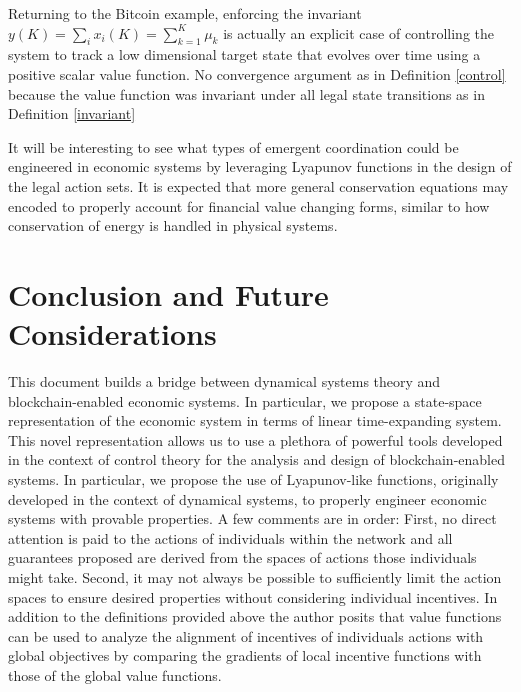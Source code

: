 \documentclass[letterpaper, 10 pt, conference]{ieeeconf}  %
\begin{document}
Returning to the Bitcoin example, enforcing the invariant $y(K) = \sum_i x_i(K) = \sum_{k=1}^K \mu_k$ is actually an explicit case of controlling the system to track a low dimensional target state that evolves over time using a positive scalar value function. No convergence argument as in Definition \ref{control} because the value function was invariant under all legal state transitions as in Definition \ref{invariant}

It will be interesting to see what types of emergent coordination could be engineered in economic systems by leveraging Lyapunov functions in the design of the legal action sets. It is expected that more general conservation equations may encoded to properly account for financial value changing forms, similar to how conservation of energy is handled in physical systems.

\section{Conclusion and Future Considerations} \label{sec:Conclusions}

This document builds a bridge between dynamical systems theory and blockchain-enabled economic systems. In particular, we propose a state-space representation of the economic system in terms of linear time-expanding system. This novel representation allows us to use a plethora of powerful tools developed in the context of control theory for the analysis and design of blockchain-enabled systems. In particular, we propose the use of Lyapunov-like functions, originally developed in the context of dynamical systems, to properly engineer economic systems with provable properties.  A few comments are in order: First, no direct attention is paid to the actions of individuals within the network and all guarantees proposed are derived from the spaces of actions those individuals might take. Second, it may not always be possible to sufficiently limit the action spaces to ensure desired properties without considering individual incentives. In addition to the definitions provided above the author posits that value functions can be used to analyze the alignment of incentives of individuals actions with global objectives by comparing the gradients of local incentive functions with those of the global value functions. 
\end{document}
